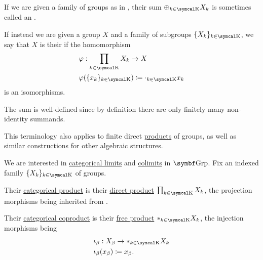 \begin{remark}\label{def:group_direct_sum_external_internal}
  If we are given a family of groups as in , their sum \( \oplus_{k \in \CK} X_k \) is sometimes called an .

  If instead we are given a group \( X \) and a family of subgroups \( \{ X_k \}_{k \in \CK} \), we say that \( X \) is their  if the homomorphism
  \begin{align*}
     & \varphi: \prod_{k \in \CK} X_k \to X                           \\
     & \varphi(\{ x_k \}_{k \in \CK}) \coloneqq \cdot_{k \in \CK} x_k
  \end{align*}
  is an isomorphisms.

  The sum is well-defined since by definition there are only finitely many non-identity summands.

  This terminology also applies to finite direct \hyperref[def:group_direct_product]{products} of groups, as well as similar constructions for other algebraic structures.
\end{remark}

\begin{proposition}\label{thm:group_categorical_limits}
  We are interested in \hyperref[def:categorical_limit]{categorical limits} and \hyperref[def:categorical_colimit]{colimits} in \( \Cat{Grp} \). Fix an indexed family  \( \{ X_k \}_{k \in \CK} \) of groups.
  \begin{DefEnum}
     Their \hyperref[def:categorical_product]{categorical product} is their \hyperref[def:group_direct_product]{direct product} \( \prod_{k \in \CK} X_k \), the projection morphisms being inherited from .

     Their \hyperref[def:categorical_coproduct]{categorical coproduct} is their \hyperref[def:group_free_product]{free product} \( \ast_{k \in \CK} X_k \), the injection morphisms being
    \begin{align*}
       & \iota_\beta: X_\beta \to \ast_{k \in \CK} X_k \\
       & \iota_\beta(x_\beta) \coloneqq x_\beta.
    \end{align*}
  \end{DefEnum}
\end{proposition}

